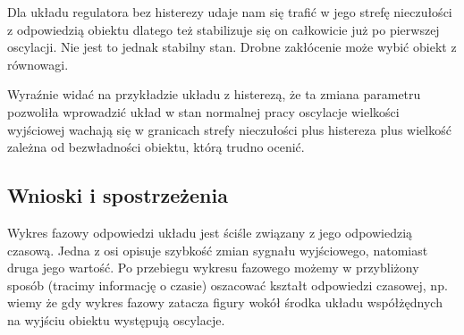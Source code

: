 \documentclass[12pt]{article}
\begin{document}
Dla układu regulatora bez histerezy udaje nam się trafić w jego strefę
nieczułości z odpowiedzią obiektu dlatego też stabilizuje się on całkowicie już
po pierwszej oscylacji. Nie jest to jednak stabilny stan. Drobne zakłócenie może
wybić obiekt z równowagi.

Wyraźnie widać na przykładzie układu z histerezą, że ta zmiana parametru
pozwoliła wprowadzić układ w stan normalnej pracy oscylacje wielkości wyjściowej
wachają się w granicach strefy nieczułości plus histereza plus wielkość zależna
od bezwładności obiektu, którą trudno ocenić.

\newpage

\subsection{Wnioski i spostrzeżenia}

Wykres fazowy odpowiedzi układu jest ściśle związany z jego odpowiedzią czasową.
Jedna z osi opisuje szybkość zmian sygnału wyjściowego, natomiast druga jego
wartość. Po przebiegu wykresu fazowego możemy w przybliżony sposób (tracimy
informację o czasie) oszacować kształt odpowiedzi czasowej, np. wiemy że gdy
wykres fazowy zatacza figury wokół środka układu współżędnych na wyjściu obiektu
występują oscylacje.
\end{document}

